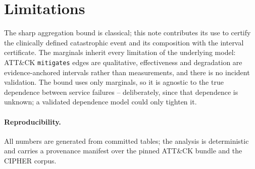 \documentclass[11pt]{article}
\begin{document}
\section{Limitations}
The sharp aggregation bound is classical; this note contributes its use to certify
the clinically defined catastrophic event and its composition with the interval
certificate. The marginals inherit every limitation of the underlying model:
ATT\&CK \texttt{mitigates} edges are qualitative, effectiveness and degradation are
evidence-anchored intervals rather than measurements, and there is no incident
validation. The bound uses only marginals, so it is agnostic to the true
dependence between service failures -- deliberately, since that dependence is
unknown; a validated dependence model could only tighten it.

\paragraph{Reproducibility.} All numbers are generated from committed tables; the
analysis is deterministic and carries a provenance manifest over the pinned ATT\&CK
bundle and the CIPHER corpus.
\end{document}
